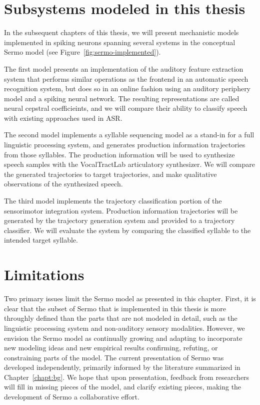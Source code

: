 

\section{Subsystems modeled in this thesis}

In the subsequent chapters of this thesis,
we will present mechanistic models
implemented in spiking neurons
spanning several systems
in the conceptual Sermo model
(see Figure~\ref{fig:sermo-implemented}).


The first model presents an implementation
of the auditory feature extraction system
that performs similar operations as
the frontend in an automatic speech recognition system,
but does so in an online fashion
using an auditory periphery model
and a spiking neural network.
The resulting representations are called
neural cepstral coefficieints,
and we will compare their ability
to classify speech with
existing approaches used in ASR.

The second model implements
a syllable sequencing model
as a stand-in for a
full linguistic processing system,
and generates production information trajectories
from those syllables.
The production information will be
used to synthesize speech samples
with the VocalTractLab articulatory synthesizer.
We will compare the generated trajectories
to target trajectories,
and make qualitative observations
of the synthesized speech.

The third model implements
the trajectory classification portion
of the sensorimotor integration system.
Production information trajectories
will be generated
by the trajectory generation system
and provided to a trajectory classifier.
We will evaluate the system by
comparing the classified syllable
to the intended target syllable.

\section{Limitations}

Two primary issues limit the Sermo model
as presented in this chapter.
First, it is clear that the subset of Sermo
that is implemented in this thesis
is more throughly defined than
the parts that are not modeled in detail,
such as the linguistic processing system
and non-auditory sensory modalities.
However, we envision the Sermo model
as continually growing and adapting
to incorporate new modeling ideas
and new empirical results confirming,
refuting, or constraining parts of the model.
The current presentation of Sermo
was developed independently,
primarily informed by the literature
summarized in Chapter~\ref{chapt:bg}.
We hope that upon presentation,
feedback from researchers will
fill in missing pieces of the model,
and clarify existing pieces,
making the development of Sermo
a collaborative effort.


